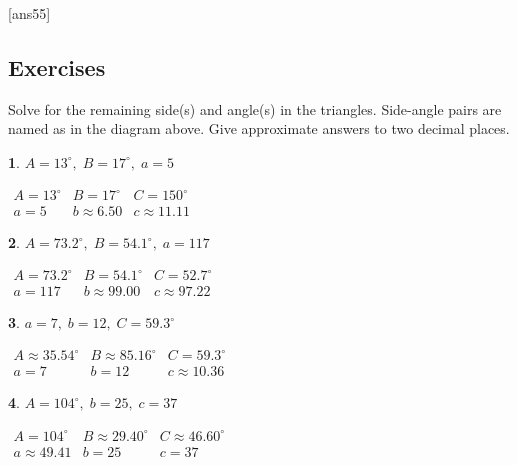 \documentclass{amsbook}
\newtheorem{exc}{}
\newenvironment{ex}{\begin{exc}\normalfont}{\end{exc}}
\numberwithin{section}{chapter}
\numberwithin{equation}{chapter}
\begin{document}
[ans55]
\subsection*{Exercises \nopunct} \hfill

Solve for the remaining side(s) and angle(s) in the triangles. Side-angle pairs are named as in the diagram above. Give approximate answers to two decimal places.

\begin{multicols}{2}
	\begin{ex}
		$A = 13^{\circ}, \; B = 17^{\circ}, \; a = 5$ 
		\begin{sol}
		$\begin{array}{lll}
		A = 13^{\circ} & B = 17^{\circ} & C = 150^{\circ} \\
		a = 5 & b \approx 6.50 & c \approx 11.11 \end{array}$	
		\end{sol}
	\end{ex}
	
	\begin{ex}
		$A = 73.2^{\circ}, \; B = 54.1^{\circ}, \; a = 117$
		\begin{sol}
		$\begin{array}{lll}
		A = 73.2^{\circ} & B = 54.1^{\circ} & C = 52.7^{\circ} \\
		a = 117 & b \approx 99.00 & c \approx 97.22 \end{array}$	
		\end{sol}
	\end{ex}

\begin{ex}
	 $a = 7, \; b = 12, \; C = 59.3^{\circ}$ 
	\begin{sol}
		$\begin{array}{lll}
		A \approx 35.54^{\circ} & B \approx 85.16^{\circ} & C = 59.3^{\circ} \\
		a = 7 & b = 12 & c \approx 10.36 \end{array}$
	\end{sol}
\end{ex}


\begin{ex}
	 $A = 104^{\circ}, \; b = 25, \; c  = 37$
	\begin{sol}
		$\begin{array}{lll}
		A = 104^{\circ} & B \approx 29.40^{\circ} & C \approx 46.60^{\circ} \\
		a \approx 49.41 & b = 25 & c = 37 \end{array}$
	\end{sol}
\end{ex}


\end{multicols}
\end{document}
